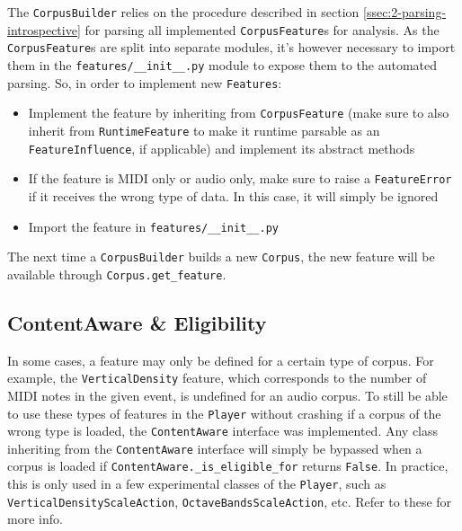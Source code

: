The \texttt{CorpusBuilder} relies on the procedure described in section \ref{ssec:2-parsing-introspective} for parsing all implemented \texttt{CorpusFeature}s for analysis. As the \texttt{CorpusFeature}s are split into separate modules, it's however necessary to import them in the \texttt{features/\_\_init\_\_.py} module to expose them to the automated parsing. So, in order to implement new \texttt{Features}:

\begin{itemize}
	\item Implement the feature by inheriting from \texttt{CorpusFeature} (make sure to also inherit from \texttt{RuntimeFeature} to make it runtime parsable as an \texttt{FeatureInfluence}, if applicable) and implement its abstract methods
	\item If the feature is MIDI only or audio only, make sure to raise a \texttt{FeatureError} if it receives the wrong type of data. In this case, it will simply be ignored
	\item Import the feature in \texttt{features/\_\_init\_\_.py}
\end{itemize}
The next time a \texttt{CorpusBuilder} builds a new \texttt{Corpus}, the new feature will be available through \texttt{Corpus.get\_feature}.

\subsection{ContentAware \& Eligibility}\label{ssec:2-features}
In some cases, a feature may only be defined for a certain type of corpus. For example, the \texttt{VerticalDensity} feature, which corresponds to the number of MIDI notes in the given event, is undefined for an audio corpus. To still be able to use these types of features in the \texttt{Player} without crashing if a corpus of the wrong type is loaded, the \texttt{ContentAware} interface was implemented. Any class inheriting from the \texttt{ContentAware} interface will simply be bypassed when a corpus is loaded if \texttt{ContentAware.\_is\_eligible\_for} returns \texttt{False}. In practice, this is only used in a few experimental classes of the \texttt{Player}, such as \texttt{VerticalDensityScaleAction}, \texttt{OctaveBandsScaleAction}, etc. Refer to these for more info.



